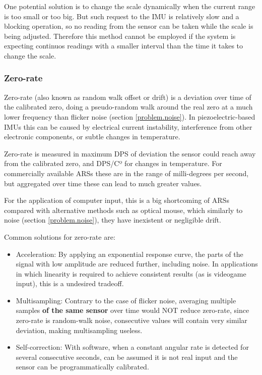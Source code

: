 \documentclass[10pt, twocolumn, a4paper]{article}
\begin{document}
        One potential solution is to change the scale dynamically when the current range is too small or too big. But such request to the IMU is relatively slow and a blocking operation, so no reading from the sensor can be taken while the scale is being adjusted. Therefore this method cannot be employed if the system is expecting continuos readings with a smaller interval than the time it takes to change the scale.

    \pagebreak
    \subsubsection{Zero-rate}
        Zero-rate (also known as random walk offset or drift) \cite{zero_rate} is a deviation over time of the calibrated zero, doing a pseudo-random walk around the real zero at a much lower frequency than flicker noise (section \ref{problem.noise}). In piezoelectric-based IMUs this can be caused by electrical current instability, interference from other electronic components, or subtle changes in temperature.

        Zero-rate is measured in maximum DPS of deviation the sensor could reach away from the calibrated zero, and DPS/Cº for changes in temperature. For commercially available ARSs these are in the range of milli-degrees per second, but aggregated over time these can lead to much greater values.

        For the application of computer input, this is a big shortcoming of ARSs compared with alternative methods such as optical mouse, which similarly to noise (section \ref{problem.noise}), they have inexistent or negligible drift.

        Common solutions for zero-rate are:
        \begin{itemize}
            \item Acceleration: By applying an exponential response curve, the parts of the signal with low amplitude are reduced further, including noise. In applications in which linearity is required to achieve consistent results (as is videogame input), this is a undesired tradeoff.
            \item Multisampling: Contrary to the case of flicker noise, averaging multiple samples \textbf{of the same sensor} over time would NOT reduce zero-rate, since zero-rate is random-walk noise, consecutive values will contain very similar deviation, making multisampling useless.
            \item Self-correction: With software, when a constant angular rate is detected for several consecutive seconds, can be assumed it is not real input and the sensor can be programmatically calibrated.
        \end{itemize}
\end{document}
